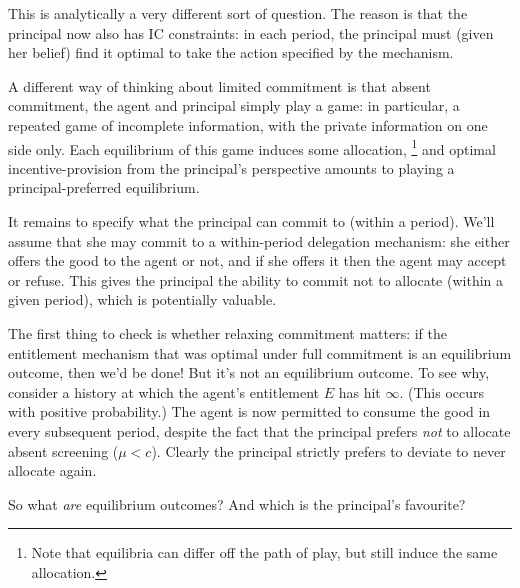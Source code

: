 This is analytically a very different sort of question. The reason is that the principal now also has IC constraints: in each period, the principal must (given her belief) find it optimal to take the action specified by the mechanism.

A different way of thinking about limited commitment is that absent commitment, the agent and principal simply play a game: in particular, a repeated game of incomplete information, with the private information on one side only.
Each equilibrium of this game induces some allocation,%
	\footnote{Note that equilibria can differ off the path of play, but still induce the same allocation.}
and optimal incentive-provision from the principal's perspective
amounts to playing a principal-preferred equilibrium.

It remains to specify what the principal can commit to (within a period).
We'll assume that she may commit to a within-period delegation mechanism:
she either offers the good to the agent or not,
and if she offers it then the agent may accept or refuse.
This gives the principal the ability to commit not to allocate (within a given period), which is potentially valuable.


The first thing to check is whether relaxing commitment matters:
if the entitlement mechanism that was optimal under full commitment is an equilibrium outcome, then we'd be done!
But it's not an equilibrium outcome.
To see why, consider a history at which the agent's entitlement $E$ has hit $\infty$. (This occurs with positive probability.)
The agent is now permitted to consume the good in every subsequent period, despite the fact that the principal prefers \emph{not} to allocate absent screening ($\mu < c$).
Clearly the principal strictly prefers to deviate to never allocate again.

So what \emph{are} equilibrium outcomes?
And which is the principal's favourite?


